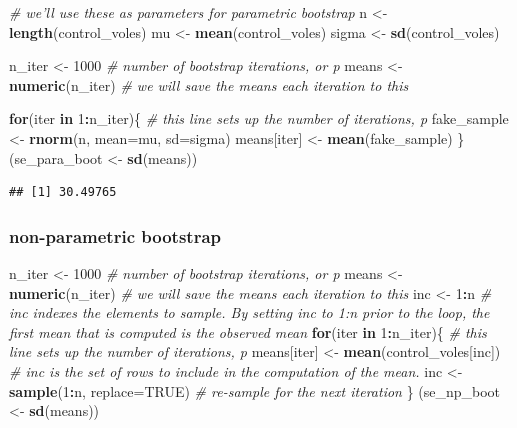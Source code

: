 \documentclass[]{book}
\newenvironment{Shaded}{\begin{snugshade}}{\end{snugshade}}
\newcommand{\CommentTok}[1]{\textcolor[rgb]{0.56,0.35,0.01}{\textit{#1}}}
\newcommand{\ControlFlowTok}[1]{\textcolor[rgb]{0.13,0.29,0.53}{\textbf{#1}}}
\newcommand{\DataTypeTok}[1]{\textcolor[rgb]{0.13,0.29,0.53}{#1}}
\newcommand{\DecValTok}[1]{\textcolor[rgb]{0.00,0.00,0.81}{#1}}
\newcommand{\KeywordTok}[1]{\textcolor[rgb]{0.13,0.29,0.53}{\textbf{#1}}}
\newcommand{\NormalTok}[1]{#1}
\newcommand{\OperatorTok}[1]{\textcolor[rgb]{0.81,0.36,0.00}{\textbf{#1}}}
\newcommand{\OtherTok}[1]{\textcolor[rgb]{0.56,0.35,0.01}{#1}}
\newcommand{\StringTok}[1]{\textcolor[rgb]{0.31,0.60,0.02}{#1}}
\begin{document}
\begin{Shaded}
\begin{Highlighting}[]
\CommentTok{# we'll use these as parameters for parametric bootstrap}
\NormalTok{n <-}\StringTok{ }\KeywordTok{length}\NormalTok{(control_voles)}
\NormalTok{mu <-}\StringTok{ }\KeywordTok{mean}\NormalTok{(control_voles)}
\NormalTok{sigma <-}\StringTok{ }\KeywordTok{sd}\NormalTok{(control_voles)}

\NormalTok{n_iter <-}\StringTok{ }\DecValTok{1000} \CommentTok{# number of bootstrap iterations, or p}
\NormalTok{means <-}\StringTok{ }\KeywordTok{numeric}\NormalTok{(n_iter) }\CommentTok{# we will save the means each iteration to this}

\ControlFlowTok{for}\NormalTok{(iter }\ControlFlowTok{in} \DecValTok{1}\OperatorTok{:}\NormalTok{n_iter)\{ }\CommentTok{# this line sets up the number of iterations, p}
\NormalTok{  fake_sample <-}\StringTok{ }\KeywordTok{rnorm}\NormalTok{(n, }\DataTypeTok{mean=}\NormalTok{mu, }\DataTypeTok{sd=}\NormalTok{sigma)}
\NormalTok{  means[iter] <-}\StringTok{ }\KeywordTok{mean}\NormalTok{(fake_sample)}
\NormalTok{\}}
\NormalTok{(se_para_boot <-}\StringTok{ }\KeywordTok{sd}\NormalTok{(means))}
\end{Highlighting}
\end{Shaded}

\begin{verbatim}
## [1] 30.49765
\end{verbatim}

\hypertarget{non-parametric-bootstrap}{%
\subsubsection{non-parametric bootstrap}\label{non-parametric-bootstrap}}

\begin{Shaded}
\begin{Highlighting}[]
\NormalTok{n_iter <-}\StringTok{ }\DecValTok{1000} \CommentTok{# number of bootstrap iterations, or p}
\NormalTok{means <-}\StringTok{ }\KeywordTok{numeric}\NormalTok{(n_iter) }\CommentTok{# we will save the means each iteration to this}
\NormalTok{inc <-}\StringTok{ }\DecValTok{1}\OperatorTok{:}\NormalTok{n }\CommentTok{# inc indexes the elements to sample. By setting inc to 1:n prior to the loop, the first mean that is computed is the observed mean}
\ControlFlowTok{for}\NormalTok{(iter }\ControlFlowTok{in} \DecValTok{1}\OperatorTok{:}\NormalTok{n_iter)\{ }\CommentTok{# this line sets up the number of iterations, p}
\NormalTok{  means[iter] <-}\StringTok{ }\KeywordTok{mean}\NormalTok{(control_voles[inc]) }\CommentTok{# inc is the set of rows to include in the computation of the mean.}
\NormalTok{  inc <-}\StringTok{ }\KeywordTok{sample}\NormalTok{(}\DecValTok{1}\OperatorTok{:}\NormalTok{n, }\DataTypeTok{replace=}\OtherTok{TRUE}\NormalTok{) }\CommentTok{# re-sample for the next iteration}
\NormalTok{\}}
\NormalTok{(se_np_boot <-}\StringTok{ }\KeywordTok{sd}\NormalTok{(means))}
\end{Highlighting}
\end{Shaded}
\end{document}
